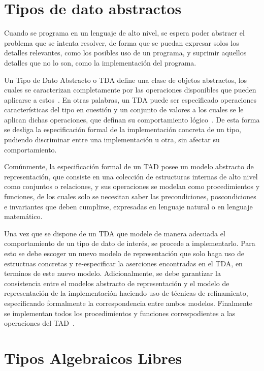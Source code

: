 \section{Tipos de dato abstractos}

Cuando se programa en un lenguaje de alto nivel, se espera poder abstraer el
problema que se intenta resolver, de forma que se puedan expresar solos los
detalles relevantes, como los posibles uso de un programa, y suprimir aquellos
detalles que no lo son, como la implementación del programa.

Un Tipo de Dato Abstracto o TDA define una clase de objetos abstractos, los
cuales se caracterizan completamente por las operaciones disponibles que
pueden aplicarse a estos~\cite{liskov}. En otras palabras, un TDA puede ser
especificado operaciones características del tipo en cuestión y un conjunto de
valores a los cuales se le aplican dichas operaciones, que definan su
comportamiento lógico~\cite{dalewalker}. De esta forma se desliga la
especificación formal de la implementación concreta de un tipo, pudiendo
discriminar entre una implementación u otra, sin afectar su comportamiento.

Comúnmente, la especificación formal de un TAD posee un modelo abstracto de
representación, que consiste en una colección de estructuras internas de alto
nivel como conjuntos o relaciones, y sus operaciones se modelan como
procedimientos y funciones, de los cuales solo se necesitan saber las
precondiciones, poscondiciones e invariantes que deben cumplirse, expresadas
en lenguaje natural o en lenguaje matemático.

Una vez que se dispone de un TDA que modele de manera adecuada el
comportamiento de un tipo de dato de interés, se procede a implementarlo. Para
esto se debe escoger un nuevo modelo de representación que solo haga uso de
estructuas concretas y re-especificar la aserciones encontradas en el TDA, en
terminos de este nuevo modelo. Adicionalmente, se debe garantizar la
consistencia entre el modelos abstracto de representación y el modelo de
representación de la implementación haciendo uso de técnicas de refinamiento,
especificando formalmente la correspondencia entre ambos modelos. Finalmente
se implementan todos los procedimientos y funciones correspodientes a las
operaciones del TAD~\cite{ravelo}.




\section{Tipos Algebraicos Libres}

